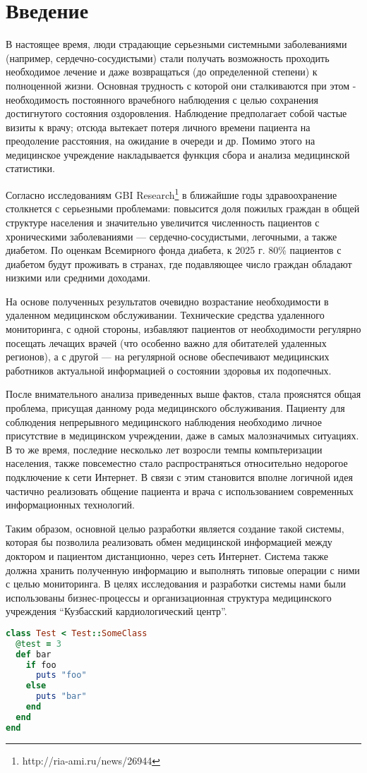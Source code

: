\newpage 
\chapter{Введение} 
В настоящее время, люди страдающие серьезными системными заболеваниями
(например, сердечно-сосудистыми) стали получать возможность проходить необходимое лечение и даже возвращаться (до
определенной степени) к полноценной жизни. Основная трудность с которой они
сталкиваются при этом - необходимость постоянного врачебного наблюдения с целью
сохранения достигнутого состояния оздоровления. Наблюдение предполагает собой
частые визиты к врачу; отсюда вытекает потеря личного времени пациента на
преодоление расстояния, на ожидание в очереди и др. Помимо этого на медицинское
учреждение накладывается функция сбора и анализа медицинской статистики.

Согласно исследованиям GBI Research\footnote{ http://ria-ami.ru/news/26944 } в
ближайшие годы здравоохранение столкнется с серьезными проблемами: повысится
доля пожилых граждан в общей структуре населения и значительно увеличится
численность пациентов с хроническими заболеваниями — сердечно-сосудистыми,
легочными, а также диабетом. По оценкам Всемирного фонда диабета, к 2025 г. 80\%
пациентов с диабетом будут проживать в странах, где подавляющее число граждан
обладают низкими или средними доходами.

На основе полученных результатов очевидно возрастание необходимости в удаленном
медицинском обслуживании. Технические средства удаленного мониторинга, с одной
стороны, избавляют пациентов от необходимости регулярно посещать лечащих врачей
(что особенно важно для обитателей удаленных регионов), а с другой — на
регулярной основе обеспечивают медицинских работников актуальной информацией о
состоянии здоровья их подопечных.

После внимательного анализа приведенных выше фактов, стала прояснятся общая
проблема, присущая данному рода медицинского обслуживания. Пациенту для
соблюдения непрерывного медицинского наблюдения необходимо личное присутствие в
медицинском учреждении, даже в самых малозначимых ситуациях.
В то же время, последние  несколько лет возросли темпы компьтеризации населения,
также повсеместно стало  распространяться относительно недорогое подключение к
сети Интернет. В связи с этим становится вполне логичной идея частично
реализовать общение пациента и врача с использованием современных информационных
технологий.

Таким образом, основной целью разработки  является создание такой системы,
которая бы позволила реализовать обмен медицинской информацией между доктором и
пациентом дистанционно, через сеть Интернет. Система также должна хранить
полученную информацию и выполнять типовые операции с ними с целью мониторинга.
В целях исследования и разработки системы нами были использованы бизнес-процессы
и организационная структура медицинского учреждения “Кузбасский кардиологический
центр”.

\begin{lstlisting}[language=Ruby,caption=Example]
class Test < Test::SomeClass
  @test = 3
  def bar
    if foo
      puts "foo"
    else
      puts "bar"
    end
  end
end
\end{lstlisting}